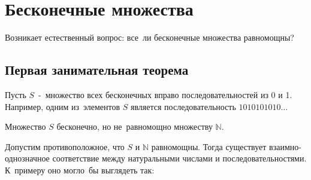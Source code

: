 \documentclass[12pt, a4paper]{article}
\begin{document}
 

\section{Бесконечные множества} 

Возникает естественный вопрос: все~ли бесконечные множества равномощны?

\subsection{Первая занимательная теорема}

Пусть $S$~-~множество всех бесконечных вправо последовательностей из 0 и 1. Например, одним из~элементов $S$ является последовательность $1010101010\ldots$

Множество $S$ бесконечно, но не~равномощно множеству $\mathbb{N}$.

Допустим противоположное, что $S$ и $\mathbb{N}$ равномощны. Тогда существует взаимно-однозначное соответствие между натуральными числами и последовательностями. К~примеру оно могло~бы выглядеть так:
\end{document}
